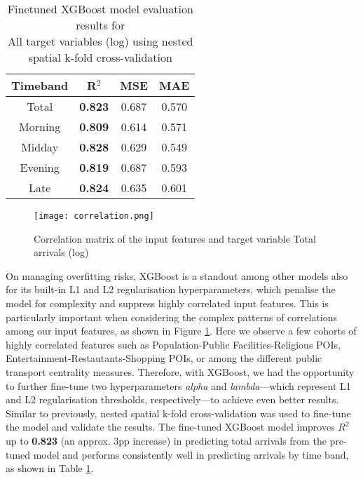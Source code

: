 \begin{table}[hb]
    \centering
    \renewcommand{\arraystretch}{1.5}
    \begin{tabular}{|c|c|c|c|}
        \hline
        \rowcolor{lightgray}
        \textbf{Timeband} & \textbf{R$^2$} & \textbf{MSE} & \textbf{MAE} \\
        \hline
        Total   & \textbf{0.823} & 0.687 & 0.570 \\
        Morning & \textbf{0.809} & 0.614 & 0.571 \\
        Midday  & \textbf{0.828} & 0.629 & 0.549 \\
        Evening & \textbf{0.819} & 0.687 & 0.593 \\
        Late    & \textbf{0.824} & 0.635 & 0.601 \\
        \hline
    \end{tabular}
    \captionsetup{justification=centering}
    \caption{Finetuned XGBoost model evaluation results for \\All target variables (log) using nested spatial k-fold cross-validation}
    \label{tab:modelevaltimeband}
\end{table}

\begin{figure}[ht]
    \centering
    \texttt{[image: correlation.png]}
    \captionsetup{justification=centering}
    \caption{Correlation matrix of the input features and target variable Total arrivals (log)}
    \label{fig:corrmatt}
\end{figure}

On managing overfitting risks, XGBoost is a standout among other models also for its built-in L1 and L2 regularisation hyperparameters, which penalise the model for complexity and suppress highly correlated input features. This is particularly important when considering the complex patterns of correlations among our input features, as shown in Figure \ref{fig:corrmatt}. Here we observe a few cohorts of highly correlated features such as Population-Public Facilities-Religious POIs, Entertainment-Restautants-Shopping POIs, or among the different public transport centrality measures. Therefore, with XGBoost, we had the opportunity to further fine-tune two hyperparameters \textit{alpha} and \textit{lambda}---which represent L1 and L2 regularisation thresholds, respectively---to achieve even better results. Similar to previously, nested spatial k-fold cross-validation was used to fine-tune the model and validate the results. The fine-tuned XGBoost model improves $R^2$ up to \textbf{0.823} (an approx. 3pp increase) in predicting total arrivals from the pre-tuned model and performs consistently well in predicting arrivals by time band, as shown in Table \ref{tab:modelevaltimeband}. 

